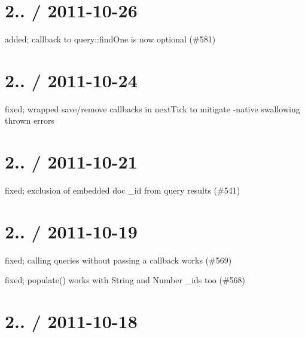 \section*{2.. / 2011-\/10-\/26 }


\begin{DoxyItemize}
\item added; callback to query\+::find\+One is now optional (\#581)
\end{DoxyItemize}

\section*{2.. / 2011-\/10-\/24 }


\begin{DoxyItemize}
\item fixed; wrapped save/remove callbacks in next\+Tick to mitigate -\/native swallowing thrown errors
\end{DoxyItemize}

\section*{2.. / 2011-\/10-\/21 }


\begin{DoxyItemize}
\item fixed; exclusion of embedded doc \+\_\+id from query results (\#541)
\end{DoxyItemize}

\section*{2.. / 2011-\/10-\/19 }


\begin{DoxyItemize}
\item fixed; calling queries without passing a callback works (\#569)
\item fixed; populate() works with String and Number \+\_\+ids too (\#568)
\end{DoxyItemize}

\section*{2.. / 2011-\/10-\/18 }


